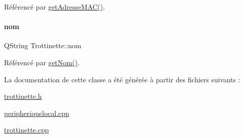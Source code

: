 Référencé par \hyperlink{class_trottinette_a4d319bfda23b3d871b62e3e910cc204d}{get\+Adresse\+M\+A\+C()}.

\mbox{\label{class_trottinette_aab7d536bd21b3dbf0b9cca5508db40ab}} 
\paragraph{\texorpdfstring{nom}{nom}}
{\footnotesize\ttfamily Q\+String Trottinette\+::nom\hspace{0.3cm}{\ttfamily [read]}}



Référencé par \hyperlink{class_trottinette_a9b191a43bacb534dca0727aedd3076cd}{get\+Nom()}.



La documentation de cette classe a été générée à partir des fichiers suivants \+:\begin{DoxyCompactItemize}
\item 
\hyperlink{trottinette_8h}{trottinette.\+h}\item 
\hyperlink{peripheriquelocal_8cpp}{peripheriquelocal.\+cpp}\item 
\hyperlink{trottinette_8cpp}{trottinette.\+cpp}\end{DoxyCompactItemize}
